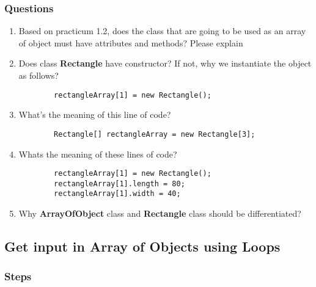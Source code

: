 \documentclass[12pt,titlepage]{article}
\begin{document}
\subsubsection{Questions}

\begin{enumerate}
    \item Based on practicum 1.2, does the class that are going to be used as an array of object must have attributes and methods? Please explain
    \item Does class \textbf{Rectangle} have constructor? If not, why we instantiate the object as follows? 
    \begin{verbatim}
        rectangleArray[1] = new Rectangle();
    \end{verbatim}
    \item What’s the meaning of this line of code?
    \begin{verbatim}
        Rectangle[] rectangleArray = new Rectangle[3];
    \end{verbatim}
    \item Whats the meaning of these lines of code? 
    \begin{verbatim}
        rectangleArray[1] = new Rectangle();
        rectangleArray[1].length = 80;
        rectangleArray[1].width = 40;
    \end{verbatim}
    \item Why \textbf{ArrayOfObject} class and \textbf{Rectangle} class should be differentiated?
\end{enumerate}

\newpage

\subsection{Get input in Array of Objects using Loops}

\subsubsection{Steps}
\end{document}
